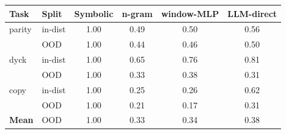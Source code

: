 \begin{tabular}{llcccc}
\toprule
Task & Split & Symbolic & n-gram & window-MLP & LLM-direct \\
\midrule
parity & in-dist & 1.00 & 0.49 & 0.50 & 0.56 \\
 & OOD & 1.00 & 0.44 & 0.46 & 0.50 \\
dyck & in-dist & 1.00 & 0.65 & 0.76 & 0.81 \\
 & OOD & 1.00 & 0.33 & 0.38 & 0.31 \\
copy & in-dist & 1.00 & 0.25 & 0.26 & 0.62 \\
 & OOD & 1.00 & 0.21 & 0.17 & 0.31 \\
\midrule
\textbf{Mean} & OOD & 1.00 & 0.33 & 0.34 & 0.38 \\
\bottomrule
\end{tabular}
